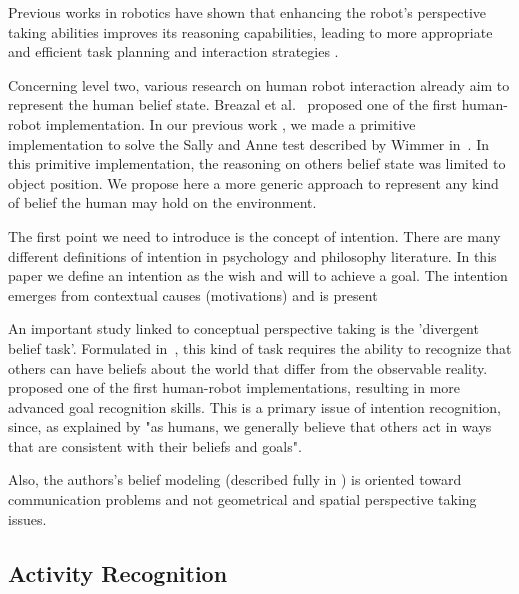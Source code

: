Previous works in robotics have shown that enhancing the robot's perspective taking abilities improves its reasoning capabilities, leading to more appropriate and efficient task planning and interaction strategies \cite{breazeal2006,Trafton2005,ros2010one}.

Concerning level two, various research on human robot interaction already aim to represent the human belief state.
Breazal et al.~\cite{BreazealGB09} proposed one of the first human-robot implementation. In our previous work \cite{Milliez2014}, we made a primitive implementation to solve the Sally and Anne test described by Wimmer in~\cite{Wimmer1983}. In this primitive implementation, the reasoning on others belief state was limited to object position. We propose here a more generic approach to represent any kind of belief the human may hold on the environment.

The first point we need to introduce is the concept of intention. There are many different definitions of intention in psychology \cite{bruner1981} and philosophy \cite{bratman1984} literature. In this paper we define an intention as the wish and will to achieve a goal. The intention emerges from contextual causes (motivations) and is present 

An important study linked to conceptual perspective taking is the 'divergent belief task'.  Formulated in~\cite{wimmer1983}, this kind of task requires the ability to recognize that others can have beliefs about the world that differ from the observable reality. ~\cite{BreazealGB09} proposed one of the first human-robot implementations, resulting in more advanced goal recognition skills. This is a primary issue of intention recognition, since, as explained by \cite{byom2013theory} "as humans, we generally believe that others act in ways that are consistent with their beliefs and goals".


Also, the authors's belief modeling (described fully in \cite{briggs2011facilitating}) is oriented toward communication problems and not geometrical and spatial perspective taking issues.

\subsection{Activity Recognition}

